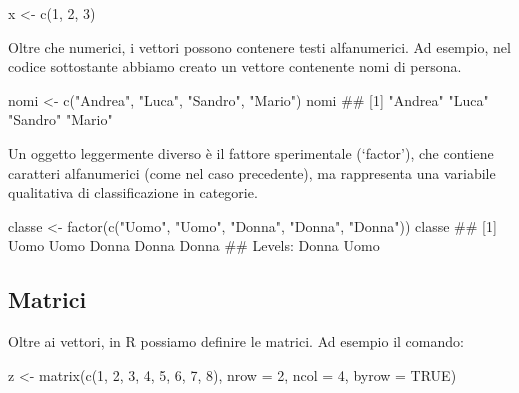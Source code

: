 \documentclass[a4paper,12pt,oneside]{book}
\newenvironment{Shaded}{\begin{snugshade}}{\end{snugshade}}
\newcommand{\DecValTok}[1]{#1}
\newcommand{\ConstantTok}[1]{#1}
\newcommand{\StringTok}[1]{#1}
\newcommand{\DocumentationTok}[1]{#1}
\newcommand{\OtherTok}[1]{#1}
\newcommand{\FunctionTok}[1]{#1}
\newcommand{\AttributeTok}[1]{#1}
\newcommand{\NormalTok}[1]{#1}
\begin{document}
\begin{Shaded}
\begin{Highlighting}[]
\NormalTok{x }\OtherTok{\textless{}{-}} \FunctionTok{c}\NormalTok{(}\DecValTok{1}\NormalTok{, }\DecValTok{2}\NormalTok{, }\DecValTok{3}\NormalTok{)}
\end{Highlighting}
\end{Shaded}

Oltre che numerici, i vettori possono contenere testi alfanumerici. Ad esempio, nel codice sottostante abbiamo creato un vettore contenente nomi di persona.

\begin{Shaded}
\begin{Highlighting}[]
\NormalTok{nomi }\OtherTok{\textless{}{-}} \FunctionTok{c}\NormalTok{(}\StringTok{"Andrea"}\NormalTok{, }\StringTok{"Luca"}\NormalTok{, }\StringTok{"Sandro"}\NormalTok{, }\StringTok{"Mario"}\NormalTok{)}
\NormalTok{nomi}
\DocumentationTok{\#\# [1] "Andrea" "Luca"   "Sandro" "Mario"}
\end{Highlighting}
\end{Shaded}

Un oggetto leggermente diverso è il fattore sperimentale (`factor'), che contiene caratteri alfanumerici (come nel caso precedente), ma rappresenta una variabile qualitativa di classificazione in categorie.

\begin{Shaded}
\begin{Highlighting}[]
\NormalTok{classe }\OtherTok{\textless{}{-}} \FunctionTok{factor}\NormalTok{(}\FunctionTok{c}\NormalTok{(}\StringTok{"Uomo"}\NormalTok{, }\StringTok{"Uomo"}\NormalTok{, }\StringTok{"Donna"}\NormalTok{, }\StringTok{"Donna"}\NormalTok{, }\StringTok{"Donna"}\NormalTok{))}
\NormalTok{classe}
\DocumentationTok{\#\# [1] Uomo  Uomo  Donna Donna Donna}
\DocumentationTok{\#\# Levels: Donna Uomo}
\end{Highlighting}
\end{Shaded}

\hypertarget{matrici}{%
\subsection{Matrici}\label{matrici}}

Oltre ai vettori, in R possiamo definire le matrici. Ad esempio il comando:

\begin{Shaded}
\begin{Highlighting}[]
\NormalTok{z  }\OtherTok{\textless{}{-}}  \FunctionTok{matrix}\NormalTok{(}\FunctionTok{c}\NormalTok{(}\DecValTok{1}\NormalTok{, }\DecValTok{2}\NormalTok{, }\DecValTok{3}\NormalTok{, }\DecValTok{4}\NormalTok{, }\DecValTok{5}\NormalTok{, }\DecValTok{6}\NormalTok{, }\DecValTok{7}\NormalTok{, }\DecValTok{8}\NormalTok{), }\AttributeTok{nrow =} \DecValTok{2}\NormalTok{, }\AttributeTok{ncol =} \DecValTok{4}\NormalTok{, }
              \AttributeTok{byrow =} \ConstantTok{TRUE}\NormalTok{)}
\end{Highlighting}
\end{Shaded}
\end{document}
